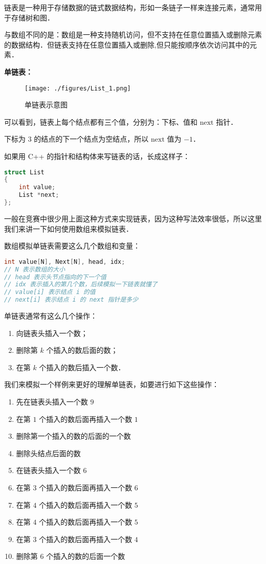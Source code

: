 
链表是一种用于存储数据的链式数据结构，形如一条链子一样来连接元素，通常用于存储树和图．

与数组不同的是：数组是一种支持随机访问，但不支持在任意位置插入或删除元素的数据结构．但链表支持在任意位置插入或删除,但只能按顺序依次访问其中的元素．

\textbf{单链表：}

\begin{figure}[ht]
\centering
\texttt{[image: ./figures/List\_1.png]}
\caption{单链表示意图} \label{List_fig1}
\end{figure}

可以看到，链表上每个结点都有三个值，分别为：下标、值和 $\text{next}$ 指针．

下标为 $3$ 的结点的下一个结点为空结点，所以 $\text{next}$ 值为 $-1$．

如果用 C++ 的指针和结构体来写链表的话，长成这样子：
\begin{lstlisting}[language=cpp]
struct List
{
    int value;
    List *next;
};
\end{lstlisting}

一般在竞赛中很少用上面这种方式来实现链表，因为这种写法效率很低，所以这里我们来讲一下如何使用数组来模拟链表．

数组模拟单链表需要这么几个数组和变量：
\begin{lstlisting}[language=cpp]
int value[N], Next[N], head, idx;
// N 表示数组的大小
// head 表示头节点指向的下一个值
// idx 表示插入的第几个数，后续模拟一下链表就懂了
// value[i] 表示结点 i 的值
// next[i] 表示结点 i 的 next 指针是多少
\end{lstlisting}

单链表通常有这么几个操作：
\begin{enumerate}
\item 向链表头插入一个数；
\item 删除第 $k$ 个插入的数后面的数；
\item 在第 $k$ 个插入的数后插入一个数．
\end{enumerate}

我们来模拟一个样例来更好的理解单链表，如要进行如下这些操作：

\begin{enumerate}
\item 先在链表头插入一个数 $9$
\item 在第 $1$ 个插入的数后面再插入一个数 $1$
\item 删除第一个插入的数的后面的一个数
\item 删除头结点后面的数
\item 在链表头插入一个数 $6$
\item 在第 $3$ 个插入的数后面再插入一个数 $6$
\item 在第 $4$ 个插入的数后面再插入一个数 $5$
\item 在第 $4$ 个插入的数后面再插入一个数 $5$
\item 在第 $3$ 个插入的数后面再插入一个数 $4$
\item 删除第 $6$ 个插入的数的后面一个数
\end{enumerate}

